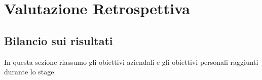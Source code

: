 
\chapter{Valutazione Retrospettiva}
\label{cap:valutazione-retrospettiva}




\section{Bilancio sui risultati}
In questa sezione riassumo gli obiettivi aziendali e gli obiettivi personali raggiunti durante lo stage.
